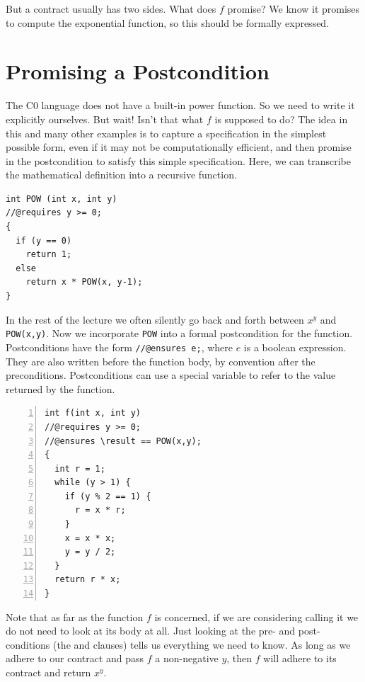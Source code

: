 But a contract usually has two sides.  What does $f$ promise?  We
know it promises to compute the exponential function, so this should
be formally expressed.


\clearpage
\section{Promising a Postcondition}
\label{sec:contracts:specification_functions}

The C0 language does not have a built-in power function.  So we need
to write it explicitly ourselves.  But wait!  Isn't that what
$f$ is supposed to do?  The idea in this and many other examples is to
capture a specification in the simplest possible form, even if it may
not be computationally efficient, and then promise in the postcondition
to satisfy this simple specification.  Here, we can transcribe the
mathematical definition into a recursive function.

\begin{lstlisting}[language={[C0]C}]
int POW (int x, int y)
//@requires y >= 0;
{
  if (y == 0)
    return 1;
  else
    return x * POW(x, y-1);
}
\end{lstlisting}

\noindent
In the rest of the lecture we often silently go back and forth between
$x^y$ and \lstinline'POW(x,y)'.  Now we incorporate \lstinline'POW' into a formal
postcondition for the function.  Postconditions have the form
\lstinline'//@ensures e;', where $e$ is a boolean expression.  They are also
written before the function body, by convention after the
preconditions.  Postconditions can use a special variable
\result{} to refer to the value returned by the function.

\begin{lstlisting}[language={[C0]C}, numbers=left]
int f(int x, int y)
//@requires y >= 0;
//@ensures \result == POW(x,y);
{
  int r = 1;
  while (y > 1) {
    if (y % 2 == 1) {
      r = x * r;
    }
    x = x * x;
    y = y / 2;
  }
  return r * x;
}
\end{lstlisting}

\noindent
Note that as far as the function $f$ is concerned, if we are considering
calling it we do not need to look at its body at all.  Just looking at the
pre- and post-conditions (the \requires{} and \ensures{} clauses) tells us
everything we need to know.  As long as we adhere to our contract and pass $f$
a non-negative $y$, then $f$ will adhere to its contract and return $x^y$.

